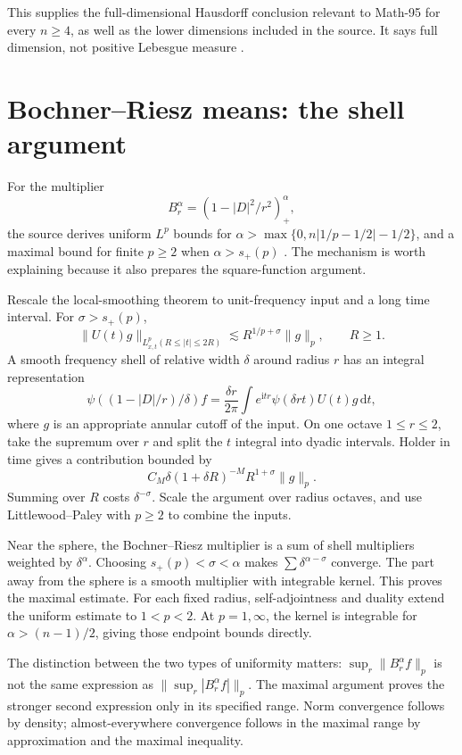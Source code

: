\documentclass[11pt,a4paper]{article}
\numberwithin{equation}{section}
\theoremstyle{definition}
\theoremstyle{remark}
\newcommand{\dd}{\,\mathrm d}
\begin{document}
This supplies the full-dimensional Hausdorff conclusion relevant to Math-95
for every $n\ge4$, as well as the lower dimensions included in the source.
It says full dimension, not positive Lebesgue measure
\cite{kakeya-proof,kakeya-catalogue}.

\section{Bochner--Riesz means: the shell argument}
\label{sec:br}
For the multiplier
\[
 B_r^\alpha=(1-|D|^2/r^2)_+^\alpha,
\]
the source derives uniform $L^p$ bounds for
$\alpha>\max\{0,n|1/p-1/2|-1/2\}$, and a maximal bound for finite
$p\ge2$ when $\alpha>s_+(p)$ \cite{consequences}.
The mechanism is worth explaining because it also prepares the square-function
argument.

Rescale the local-smoothing theorem to unit-frequency input and a long time
interval. For $\sigma>s_+(p)$,
\[
 \|U(t)g\|_{L^p_{x,t}(R\le|t|\le2R)}
 \lesssim R^{1/p+\sigma}\|g\|_p,
 \qquad R\ge1.
\]
A smooth frequency shell of relative width $\delta$ around radius $r$ has
an integral representation
\[
 \psi((1-|D|/r)/\delta)f
 =\frac{\delta r}{2\pi}\int e^{\mathrm itr}
                  \widehat\psi(\delta rt)U(t)g\dd t,
\]
where $g$ is an appropriate annular cutoff of the input. On one octave
$1\le r\le2$, take the supremum over $r$ and split the $t$ integral into
dyadic intervals. Holder in time gives a contribution bounded by
\[
 C_M\delta(1+\delta R)^{-M}R^{1+\sigma}\|g\|_p.
\]
Summing over $R$ costs $\delta^{-\sigma}$. Scale the argument over radius
octaves, and use Littlewood--Paley with $p\ge2$ to combine the inputs.

Near the sphere, the Bochner--Riesz multiplier is a sum of shell multipliers
weighted by $\delta^\alpha$. Choosing $s_+(p)<\sigma<\alpha$ makes
$\sum\delta^{\alpha-\sigma}$ converge. The part away from the sphere is a
smooth multiplier with integrable kernel. This proves the maximal estimate.
For each fixed radius, self-adjointness and duality extend the uniform estimate
to $1<p<2$. At $p=1,\infty$, the kernel is integrable for
$\alpha>(n-1)/2$, giving those endpoint bounds directly.

The distinction between the two types of uniformity matters:
$\sup_r\|B_r^\alpha f\|_p$ is not the same expression as
$\|\sup_r|B_r^\alpha f|\|_p$. The maximal argument proves the stronger second
expression only in its specified range. Norm convergence follows by density;
almost-everywhere convergence follows in the maximal range by approximation
and the maximal inequality.
\end{document}
